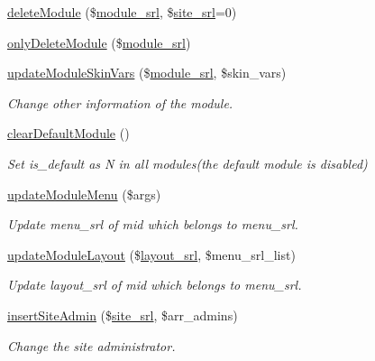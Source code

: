 \begin{DoxyCompactItemize}
\hyperlink{classmoduleController_add52eeb3f4a3cb900376af8007c09655}{delete\-Module} (\$\hyperlink{ko_8install_8php_a370bb6450fab1da3e0ed9f484a38b761}{module\-\_\-srl}, \$\hyperlink{ko_8install_8php_a8b1406b4ad1048041558dce6bfe89004}{site\-\_\-srl}=0)
\item 
\hyperlink{classmoduleController_ae34115eaf3d3b4d7621592f7cbfb9c7c}{only\-Delete\-Module} (\$\hyperlink{ko_8install_8php_a370bb6450fab1da3e0ed9f484a38b761}{module\-\_\-srl})
\item 
\hyperlink{classmoduleController_aa877238508d8cde2ad00f40b8ff283c0}{update\-Module\-Skin\-Vars} (\$\hyperlink{ko_8install_8php_a370bb6450fab1da3e0ed9f484a38b761}{module\-\_\-srl}, \$skin\-\_\-vars)
\begin{DoxyCompactList}\small\item\em Change other information of the module. \end{DoxyCompactList}\item 
\hyperlink{classmoduleController_a2534f4a4108716e06d61eb984f700fdb}{clear\-Default\-Module} ()
\begin{DoxyCompactList}\small\item\em Set is\-\_\-default as N in all modules(the default module is disabled) \end{DoxyCompactList}\item 
\hyperlink{classmoduleController_a7583bb9beb47ba3ecc1149546716e9f7}{update\-Module\-Menu} (\$args)
\begin{DoxyCompactList}\small\item\em Update menu\-\_\-srl of mid which belongs to menu\-\_\-srl. \end{DoxyCompactList}\item 
\hyperlink{classmoduleController_a4789510265aa0276d79e29cb9d9ce24c}{update\-Module\-Layout} (\$\hyperlink{ko_8install_8php_a70054876db09b2519a1726663c8dd9e7}{layout\-\_\-srl}, \$menu\-\_\-srl\-\_\-list)
\begin{DoxyCompactList}\small\item\em Update layout\-\_\-srl of mid which belongs to menu\-\_\-srl. \end{DoxyCompactList}\item 
\hyperlink{classmoduleController_a970ea23d2ebfdb1353139923a05a173a}{insert\-Site\-Admin} (\$\hyperlink{ko_8install_8php_a8b1406b4ad1048041558dce6bfe89004}{site\-\_\-srl}, \$arr\-\_\-admins)
\begin{DoxyCompactList}\small\item\em Change the site administrator. \end{DoxyCompactList}\item 

\end{DoxyCompactItemize}
